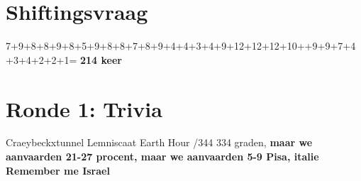 \section{Shiftingsvraag}

7+9+8+8+9+8+5+9+8+8+7+8+9+4+4+3+4+9+12+12+12+10++9+9+7+4+3+4+2+2+1= \bf{214} keer



\section{Ronde 1: Trivia}
\begin{questions}

\question[2] Craeybeckxtunnel
\vspace{5mm}
\question[2] Lemniscaat
\vspace{5mm}
\vspace{5mm}
\question[2] Earth Hour
\vspace{5mm}
/344 334
\vspace{5mm}
 graden, \bf{maar we aanvaarden 21-27}
\vspace{5mm}
 procent, \bf{maar we aanvaarden 5-9}
\vspace{5mm}
\question[2] Pisa, italie
\vspace{5mm}
\question[2] Remember me
\vspace{5mm}
\question[2] Israel

\end{questions}
\newpage
